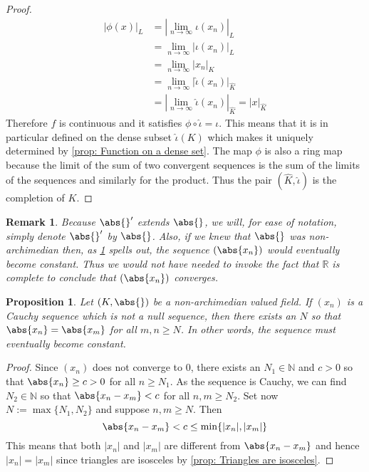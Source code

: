 \documentclass{article}
\newtheorem{proposition}{Proposition}[section]
\newtheorem{remark}{Remark}[section]
\newcommand{\mbb}[1]{\mathbb{#1}}
\numberwithin{equation}{section}
\begin{document}
\begin{proof}
    \begin{align*}
        |\phi(x)|_{L} & = |\lim_{n \to \infty} \iota(x_n)|_{L}                          \\
                      & = \lim_{n \to \infty} |\iota(x_n)|_{L}                          \\
                      & = \lim_{n \to \infty} |x_n|_{K}                                 \\
                      & = \lim_{n \to \infty} |\hat \iota(x_n)|_{\hat K}                \\
                      & = |\lim_{n \to \infty} \hat \iota(x_n)|_{\hat K} = |x|_{\hat K}
    \end{align*}
    Therefore $f$ is continuous and it satisfies $\phi \circ \hat \iota = \iota$. This means that it is in particular defined on the dense subset $\hat \iota(K)$ which makes it uniquely determined by \cref{prop: Function on a dense set}. The map $\phi$ is also a ring map because the limit of the sum of two convergent sequences is the sum of the limits of the sequences and similarly for the product. Thus the pair $(\hat K, \hat \iota)$ is the completion of $K$.
\end{proof}
\begin{remark}
    Because $\abs{}'$ extends $\abs{}$, we will, for ease of notation, simply denote $\abs{}'$ by $\abs{}$. Also, if we knew that $\abs{}$ was non-archimedian then, as \cref{prop: Non-archimedian absolute value has constant tail} spells out, the sequence $(\abs{x_n})$ would eventually become constant. Thus we would not have needed to invoke the fact that $\mbb R$ is complete to conclude that $(\abs{x_n})$ converges.
\end{remark}






\begin{proposition}\label{prop: Non-archimedian absolute value has constant tail}
    Let $(K, \abs{})$ be a non-archimedian valued field. If $(x_n)$ is a Cauchy sequence which is not a null sequence, then there exists an $N$ so that $\abs{x_n} = \abs{x_m}$ for all $m,n \geq N$. In other words, the sequence must eventually become constant.
\end{proposition}
\begin{proof}
    Since $(x_n)$ does not converge to 0, there exists an $N_1 \in \mbb N$ and $c > 0$ so that $\abs{x_n} \geq c > 0$ for all $n \geq N_1$. As the sequence is Cauchy, we can find $N_2 \in \mbb N$ so that $\abs{x_n - x_m} < c$ for all $n,m \geq N_2$. Set now $N := \max \{N_1, N_2\}$ and suppose $n,m \geq N$. Then
    $$\abs{x_n - x_m} <  c \leq \min\{|x_n|, |x_m|\}$$
    This means that both $|x_n|$ and $|x_m|$ are different from $\abs{x_n - x_m}$ and hence $|x_n| = |x_m|$ since triangles are isosceles by \cref{prop: Triangles are isosceles}.
\end{proof}
\end{document}
